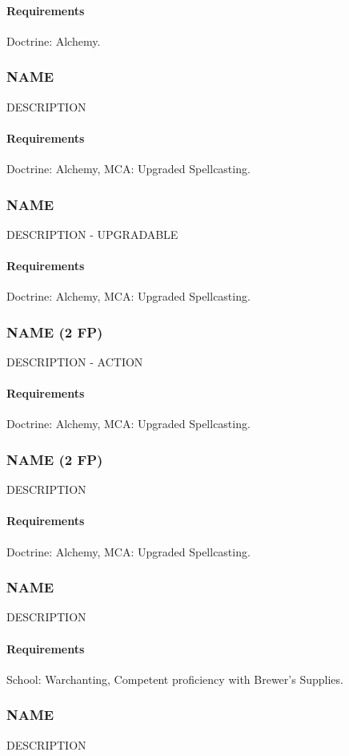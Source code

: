     \paragraph{Requirements} Doctrine: Alchemy.
\subsubsection{NAME} \label{feat::name}
    DESCRIPTION
    \paragraph{Requirements} Doctrine: Alchemy, MCA: Upgraded Spellcasting.
\subsubsection{NAME} \label{feat::name}
    DESCRIPTION - UPGRADABLE
    \paragraph{Requirements} Doctrine: Alchemy, MCA: Upgraded Spellcasting.
\subsubsection{NAME (2 FP)} \label{feat::name}
    DESCRIPTION - ACTION
    \paragraph{Requirements} Doctrine: Alchemy, MCA: Upgraded Spellcasting.
\subsubsection{NAME (2 FP)} \label{feat::name}
    DESCRIPTION
    \paragraph{Requirements} Doctrine: Alchemy, MCA: Upgraded Spellcasting.

\subsubsection{NAME} \label{feat::name}
    DESCRIPTION
    \paragraph{Requirements} School: Warchanting, Competent proficiency with Brewer's Supplies.
\subsubsection{NAME} \label{feat::name}
    DESCRIPTION
